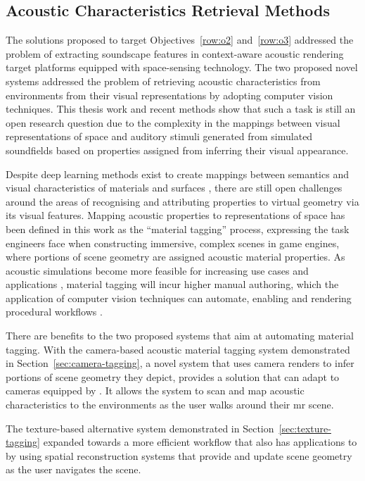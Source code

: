 \subsection{Acoustic Characteristics Retrieval Methods}
The solutions proposed to target Objectives~\ref{row:o2} and~\ref{row:o3} addressed the problem of extracting soundscape features in context-aware acoustic rendering target platforms equipped with space-sensing technology. The two proposed novel systems addressed the problem of retrieving acoustic characteristics from environments from their visual representations by adopting computer vision techniques. This thesis work and recent methods show that such a task is still an open research question due to the complexity in the mappings between visual representations of space and auditory stimuli generated from simulated soundfields based on properties assigned from inferring their visual appearance.\par
Despite deep learning methods exist to create mappings between semantics and visual characteristics of materials and surfaces \citep{gaur2019superpixel,chen2022visual}, there are still open challenges around the areas of recognising and attributing properties to virtual geometry via its visual features.
Mapping acoustic properties to representations of space has been defined in this work as the ``material tagging'' process, expressing the task engineers face when constructing immersive, complex scenes in game engines, where portions of scene geometry are assigned acoustic material properties. As acoustic simulations become more feasible for increasing use cases and applications \citep{liu2020sound}, material tagging will incur higher manual authoring, which the application of computer vision techniques can automate, enabling and rendering procedural workflows \citep{schissler2017acoustic}.\par
There are benefits to the two proposed systems that aim at automating material tagging. With the camera-based acoustic material tagging system demonstrated in Section~\ref{sec:camera-tagging}, a novel system that uses camera renders to infer portions of scene geometry they depict, provides a solution that can adapt to cameras equipped by . It allows the system to scan and map acoustic characteristics to the environments as the user walks around their \acrshort{mr} scene.\par
The texture-based alternative system demonstrated in Section~\ref{sec:texture-tagging} expanded towards a more efficient workflow that also has applications to  by using spatial reconstruction systems that provide and update scene geometry as the user navigates the scene.

